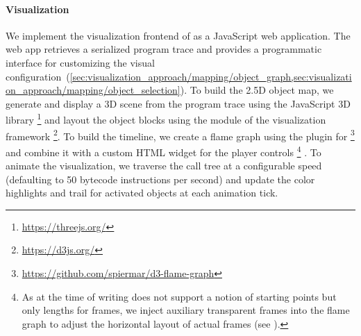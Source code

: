\paragraph{Visualization}
\label{sec:implementation/visualization}

We implement the visualization frontend of \tfd{} as a JavaScript web application.
The web app retrieves a serialized program trace and provides a programmatic interface for customizing the visual configuration~(\cref{sec:visualization_approach/mapping/object_graph,sec:visualization_approach/mapping/object_selection}).
To build the 2.5D object map, we generate and display a 3D scene from the program trace using the JavaScript 3D library \footnote{\url{https://threejs.org/}} and layout the object blocks using the  module of the visualization framework \footnote{\url{https://d3js.org/}}.
To build the timeline, we create a flame graph using the  plugin for \footnote{\url{https://github.com/spiermar/d3-flame-graph}} and combine it with a custom HTML widget for the player controls%
\footnote{As  at the time of writing does not support a notion of starting points but only lengths for frames, we inject auxiliary transparent frames into the flame graph to adjust the horizontal layout of actual frames (see ).}%
.
To animate the visualization, we traverse the call tree at a configurable speed (defaulting to 50 bytecode instructions per second) and update the color highlights and trail for activated objects at each animation tick.
